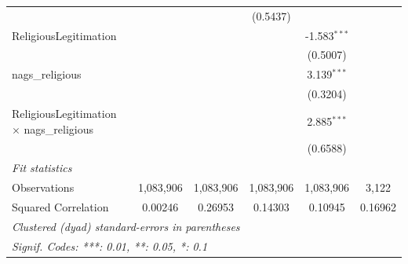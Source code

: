 \begin{tabular}{lccccc}
                                                             &                 &                 & (0.5437)        &                 &   \\   
   ReligiousLegitimation                                     &                 &                 &                 & -1.583$^{***}$  &   \\   
                                                             &                 &                 &                 & (0.5007)        &   \\   
   nags\_religious                                           &                 &                 &                 & 3.139$^{***}$   &   \\   
                                                             &                 &                 &                 & (0.3204)        &   \\   
   ReligiousLegitimation $\times$ nags\_religious            &                 &                 &                 & 2.885$^{***}$   &   \\   
                                                             &                 &                 &                 & (0.6588)        &   \\   
   \midrule
   \emph{Fit statistics}\\
   Observations                                              & 1,083,906       & 1,083,906       & 1,083,906       & 1,083,906       & 3,122\\  
   Squared Correlation                                       & 0.00246         & 0.26953         & 0.14303         & 0.10945         & 0.16962\\  
   \midrule \midrule
   \multicolumn{6}{l}{\emph{Clustered (dyad) standard-errors in parentheses}}\\
   \multicolumn{6}{l}{\emph{Signif. Codes: ***: 0.01, **: 0.05, *: 0.1}}\\
\end{tabular}
\par\endgroup


